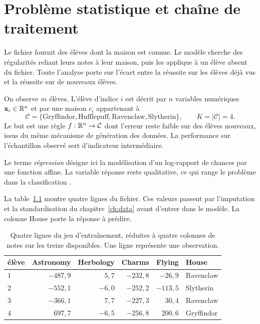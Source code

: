 \chapter{Problème statistique et chaîne de traitement}
\label{ch:problem}

\begin{lecture}
Le fichier fournit des élèves dont la maison est connue. Le modèle cherche des
régularités reliant leurs notes à leur maison, puis les applique à un élève
absent du fichier. Toute l'analyse porte sur l'écart entre la réussite sur les
élèves déjà vus et la réussite sur de nouveaux élèves.
\end{lecture}

On observe $m$ élèves. L'élève d'indice $i$ est décrit par $n$ variables numériques
$\mathbf{x}_i\in\mathbb{R}^n$ et par une maison $c_i$ appartenant à
\[
  \mathcal C=\{\text{Gryffindor},\text{Hufflepuff},
  \text{Ravenclaw},\text{Slytherin}\},\qquad K=|\mathcal C|=4.
\]
Le but est une règle $f:\mathbb{R}^n\to\mathcal C$ dont l'erreur reste faible sur des
élèves nouveaux, issus du même mécanisme de génération des données. La
performance sur l'échantillon observé sert d'indicateur intermédiaire.

Le terme \emph{régression} désigne ici la modélisation d'un log-rapport de chances
par une fonction affine. La variable réponse reste qualitative, ce qui range le
problème dans la classification \cite[chap.~4]{hastie2009}.

La table~\ref{tab:sample} montre quatre lignes du fichier. Ces valeurs passent par
l'imputation et la standardisation du chapitre~\ref{ch:data} avant d'entrer dans
le modèle. La colonne House porte la réponse à prédire.

\begin{table}[htbp]
\centering
\begin{tabular}{lrrrrl}
\toprule
élève & Astronomy & Herbology & Charms & Flying & House \\
\midrule
$1$ & $-487{,}9$ & $ 5{,}7$ & $-232{,}8$ & $-26{,}9$  & Ravenclaw \\
$2$ & $-552{,}1$ & $-6{,}0$ & $-252{,}2$ & $-113{,}5$ & Slytherin \\
$3$ & $-366{,}1$ & $ 7{,}7$ & $-227{,}3$ & $ 30{,}4$  & Ravenclaw \\
$4$ & $ 697{,}7$ & $-6{,}5$ & $-256{,}8$ & $200{,}6$  & Gryffindor \\
\bottomrule
\end{tabular}
\caption{Quatre lignes du jeu d'entraînement, réduites à quatre colonnes de notes
sur les treize disponibles. Une ligne représente une observation.}
\label{tab:sample}
\end{table}

